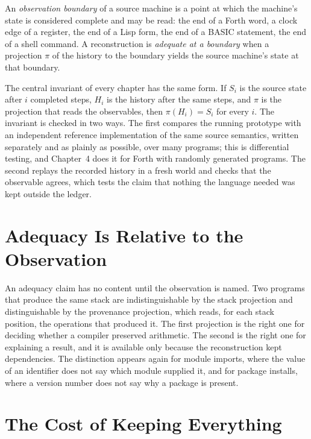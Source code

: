 \begin{definition}
An \emph{observation boundary} of a source machine is a point at which the machine's state is considered complete and may be read: the end of a Forth word, a clock edge of a register, the end of a Lisp form, the end of a BASIC statement, the end of a shell command. A reconstruction is \emph{adequate at a boundary} when a projection $\pi$ of the \SP{} history to the boundary yields the source machine's state at that boundary.
\end{definition}

The central invariant of every chapter has the same form. If $S_i$ is the source state after $i$ completed steps, $H_i$ is the history after the same steps, and $\pi$ is the projection that reads the observables, then $\pi(H_i)=S_i$ for every $i$. The invariant is checked in two ways. The first compares the running prototype with an independent reference implementation of the same source semantics, written separately and as plainly as possible, over many programs; this is differential testing, and Chapter~4 does it for Forth with randomly generated programs. The second replays the recorded history in a fresh world and checks that the observable agrees, which tests the claim that nothing the language needed was kept outside the ledger.

\section{Adequacy Is Relative to the Observation}

An adequacy claim has no content until the observation is named. Two programs that produce the same stack are indistinguishable by the stack projection and distinguishable by the provenance projection, which reads, for each stack position, the operations that produced it. The first projection is the right one for deciding whether a compiler preserved arithmetic. The second is the right one for explaining a result, and it is available only because the reconstruction kept dependencies. The distinction appears again for module imports, where the value of an identifier does not say which module supplied it, and for package installs, where a version number does not say why a package is present.

\section{The Cost of Keeping Everything}

